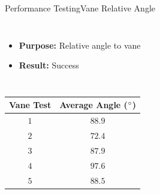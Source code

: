 \begin{frame}{Performance Testing}{Vane Relative Angle}
\begin{columns}
    \begin{itemize}
        \item \textbf{Purpose:} Relative angle to vane
        \item \textbf{Result:} Success
    \end{itemize}
\end{columns}
\vspace{10pt}
\begin{table}[!h]
    \centering
\begin{tabular}{cc}
    \hline
     \rowcolor{beamer@barcolor} Vane Test & Average Angle ($\degree$)  \\
     \hline
      $1$ & $88.9$ \\
      \rowcolor{beamer@barcolor} $2$ & $72.4$ \\
      $3$ & $87.9$ \\
      \rowcolor{beamer@barcolor} $4$ & $97.6$ \\
      $5$ & $88.5$ \\
      \hline
\end{tabular}
\end{table}
\end{frame}



